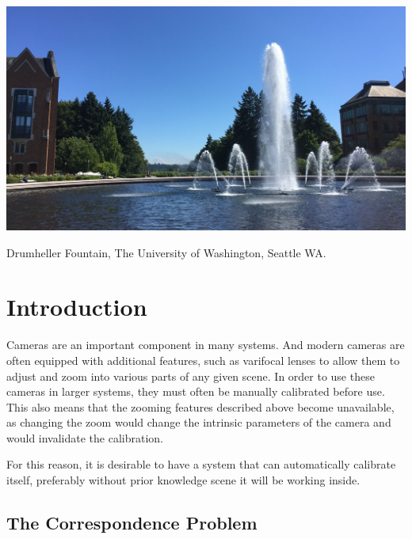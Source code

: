\documentclass[preprint,acmtog]{acmart}
\begin{document}


\begin{teaserfigure}
  \centering
  \includegraphics[width=6.0in]{fountain}
  \caption{Drumheller Fountain, The University of Washington, Seattle WA.}
\end{teaserfigure}

\maketitle

\section{Introduction}

Cameras are an important component in many systems. And modern cameras are often
equipped with additional features, such as varifocal lenses to allow them to
adjust and zoom into various parts of any given scene. In order to use these
cameras in larger systems, they must often be manually calibrated before
use. This also means that the zooming features described above become
unavailable, as changing the zoom would change the intrinsic parameters of the
camera and would invalidate the calibration.

For this reason, it is desirable to have a system that can automatically
calibrate itself, preferably without prior knowledge scene it will be working
inside.


\subsection{The Correspondence Problem}
\end{document}
